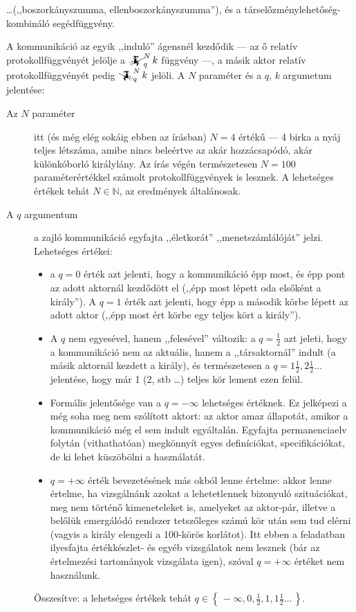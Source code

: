 \documentclass{article}
\newcommand{\setOf}[1]{\left\lbrace\,#1\,\right\rbrace}
\newcommand{\mainfunA}[3]{\mathwitch_{#2}^{#1}#3}
\newcommand{\mainfunB}[3]{\reversemathwitch_{#2}^{#1}#3}
\begin{document}
	 \dots (,,boszorkányszumma, ellenboszorkányszumma''), és a társelőzménylehetőség-kombináló segédfüggvény.


	A kommunikáció az egyik ,,induló'' ágensnél kezdődik --- az ő relatív protokollfüggvényét jelölje a $\mainfunA Nqk$ függvény ---, a másik aktor relatív protokollfüggvényét pedig  $\mainfunB Nqk$ jelöli. A $N$ paraméter és a $q$, $k$ argumetum jelentése:

	\begin{description}
		\item[Az $N$ paraméter] itt (és még elég sokáig ebben az írásban) $N=4$ értékű --- 4 birka a nyáj teljes létszáma, amibe nincs beleértve az akár hozzácsapódó, akár különkóborló királylány.
		Az írás végén természetesen $N=100$ paraméterértékkel számolt protokollfüggvények is lesznek.
		A lehetséges értékek tehát $N \in \mathbb N$, az eredmények általánosak.

		\item[A $q$ argumentum] a zajló kommunikáció egyfajta ,,életkorát'' ,,menetszámlálóját'' jelzi.
		Lehetséges értékei:
		\begin{itemize}
			\item a $q = 0$ érték azt jelenti, hogy a kommunikáció épp most, és épp pont az adott aktornál kezdődött el (,,épp most lépett oda elsőként a király''). A $q = 1$ érték azt jelenti, hogy épp a második körbe lépett az adott aktor (,,épp most ért körbe egy teljes kört a király'').
			\item A $q$ nem egyesével, hanem ,,felesével'' változik: a $q = \frac12$ azt jeleti, hogy a kommunikáció nem az aktuális, hanem a ,,társaktornál'' indult (a másik aktornál kezdett a király), és természetesen a $q = 1\frac12, 2\frac12 \dots$ jelentése, hogy már 1 (2, stb \dots) teljes kör lement ezen felül.
			\item Formális jelentősége van a $q = -\infty$ lehetséges értéknek. Ez jelképezi a még soha meg nem szólított aktort: az aktor amaz állapotát, amikor a kommunikáció még el sem indult egyáltalán. Egyfajta permanenciaelv folytán (vithathatóan) megkönnyít egyes definíciókat, specifikációkat, de ki lehet küszöbölni a használatát.
			\item $q = +\infty$ érték bevezetésének más okból lenne értelme: akkor lenne értelme, ha vizsgálnánk azokat a lehetetlennek bizonyuló szituációkat, meg nem történő kimeneteleket is, amelyeket az aktor-pár, illetve a belőlük emergálódó rendszer tetszőleges számú kör után sem tud elérni (vagyis a király elengedi a 100-körös korlátot). Itt ebben a feladatban ilyesfajta értékkészlet- és egyéb vizsgálatok nem lesznek (bár az értelmezési tartományok vizsgálata igen), szóval $q = +\infty$ értéket nem használunk.
		\end{itemize}
		Összesítve: a lehetséges értékek tehát $q \in \setOf{-\infty, 0, \frac12, 1, 1\frac12\dots}$.


\end{description}
\end{document}
